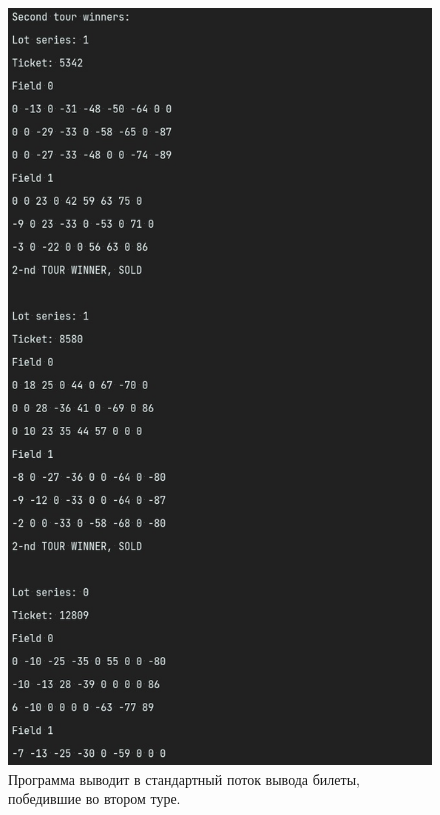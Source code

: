 \documentclass[a4paper,14pt]{article}
\begin{document}
\begin{figure}[H]
  \centering
  \captionsetup{justification=centering,margin=1cm}
  \includegraphics[scale=.95]{pictures/4}
  \caption{Программа выводит в стандартный поток вывода билеты, победившие во втором туре.}
\end{figure}
\end{document}
